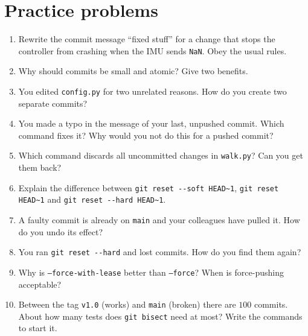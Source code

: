 \section*{Practice problems}
\begin{enumerate}[label=\textbf{\thechapter.\arabic*}]
  \item Rewrite the commit message ``fixed stuff'' for a change that stops the controller from crashing when the IMU sends \texttt{NaN}. Obey the usual rules.
  \item Why should commits be small and atomic? Give two benefits.
  \item You edited \texttt{config.py} for two unrelated reasons. How do you create two separate commits?
  \item You made a typo in the message of your last, unpushed commit. Which command fixes it? Why would you not do this for a pushed commit?
  \item Which command discards all uncommitted changes in \texttt{walk.py}? Can you get them back?
  \item Explain the difference between \verb!git reset --soft HEAD~1!, \verb!git reset HEAD~1! and \verb!git reset --hard HEAD~1!.
  \item A faulty commit is already on \texttt{main} and your colleagues have pulled it. How do you undo its effect?
  \item You ran \verb!git reset --hard! and lost commits. How do you find them again?
  \item Why is \texttt{--force-with-lease} better than \texttt{--force}? When is force-pushing acceptable?
  \item[\textbf{\thechapter.10}$\star$] Between the tag \texttt{v1.0} (works) and \texttt{main} (broken) there are $100$ commits. About how many tests does \texttt{git bisect} need at most? Write the commands to start it.
\end{enumerate}
